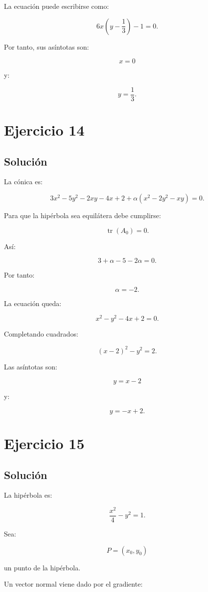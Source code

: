 \documentclass[11pt,a4paper]{article}
\newcommand{\tr}{\operatorname{tr}}
\begin{document}
La ecuación puede escribirse como:

\[
6x\left(
y-\frac13
\right)-1=0.
\]

Por tanto, sus asíntotas son:

\[
\boxed{
x=0
}
\]

y:

\[
\boxed{
y=\frac13.
}
\]

\section{Ejercicio 14}
\subsection{Solución}

La cónica es:

\[
3x^2-5y^2-2xy-4x+2
+
\alpha(x^2-2y^2-xy)
=
0.
\]

Para que la hipérbola sea equilátera debe cumplirse:

\[
\tr(A_0)=0.
\]

Así:

\[
3+\alpha-5-2\alpha=0.
\]

Por tanto:

\[
\boxed{
\alpha=-2.
}
\]

La ecuación queda:

\[
x^2-y^2-4x+2=0.
\]

Completando cuadrados:

\[
(x-2)^2-y^2=2.
\]

Las asíntotas son:

\[
\boxed{
y=x-2
}
\]

y:

\[
\boxed{
y=-x+2.
}
\]

\section{Ejercicio 15}
\subsection{Solución}

La hipérbola es:

\[
\frac{x^2}{4}-y^2=1.
\]

Sea:

\[
P=(x_0,y_0)
\]

un punto de la hipérbola.

Un vector normal viene dado por el gradiente:
\end{document}
